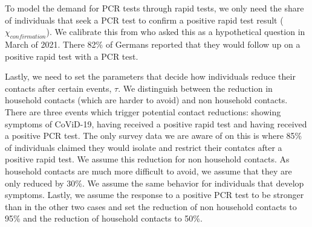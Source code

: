 To model the demand for PCR tests through rapid tests, we only need the share of
individuals that seek a PCR test to confirm a positive rapid test result
($\chi_{confirmation}$). We calibrate this from \citet{Betsch2021} who asked this as a
hypothetical question in March of 2021. There 82\% of Germans reported that they would
follow up on a positive rapid test with a PCR test.


Lastly, we need to set the parameters that decide how individuals reduce their contacts
after certain events, $\tau$. We distinguish between the reduction in household contacts
(which are harder to avoid) and non household contacts. There are three events which
trigger potential contact reductions: showing symptoms of CoViD-19, having received a
positive rapid test and having received a positive PCR test. The only survey data we are
aware of on this is \citet{Betsch2021} where 85\% of individuals claimed they
would isolate and restrict their contatcs after a positive rapid test. We assume this
reduction for non household contacts. As household contacts are much more difficult to
avoid, we assume that they are only reduced by 30\%. We assume the same behavior for
individuals that develop symptoms. Lastly, we assume the response to a positive PCR test
to be stronger than in the other two cases and set the reduction of non household
contacts to 95\% and the reduction of household contacts to 50\%.

\FloatBarrier